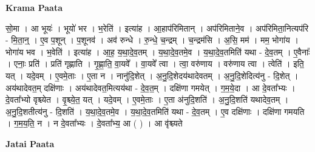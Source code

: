 \documentclass[17pt]{extarticle}
\begin{document}
\textbf{Krama Paata} \newline

सो॒मा । आ भूयः॑ । भूयो॑ भर । भ॒रेति॑ । इत्या॑ह । आ॒हाप॑रिमितान् । अप॑रिमिताने॒व । अप॑रिमिता॒नित्यप॑रि - मि॒ता॒न्॒ । ए॒व प॒शून् । प॒शूनव॑ । अव॑ रुन्धे । रु॒न्धे॒ च॒न्द्रम् । च॒न्द्रम॑सि । अ॒सि॒ मम॑ । मम॒ भोगा॑य । भोगा॑य भव । भ॒वेति॑ । इत्या॑ह । आ॒ह॒ य॒था॒दे॒व॒तम् । य॒था॒दे॒व॒तमे॒व । य॒था॒दे॒व॒तमिति॑ यथा - दे॒व॒तम् । ए॒वैनाः᳚ । एनाः॒ प्रति॑ । प्रति॑ गृह्णाति । गृ॒ह्णा॒ति॒ वा॒यवे᳚ । वा॒यवे᳚ त्वा । त्वा॒ वरु॑णाय । वरु॑णाय त्वा । त्वेति॑ । इति॒ यत् । यदे॒वम् । ए॒वमे॒ताः । ए॒ता न । नानु॑दि॒शेत् । अ॒नु॒दि॒शेदय॑थादेवतम् । अ॒नु॒दि॒शेदित्य॑नु - दि॒शेत् । अय॑थादेवत॒म् दक्षि॑णाः । अय॑थादेवत॒मित्यय॑था - दे॒व॒त॒म् । दक्षि॑णा गमयेत् । ग॒म॒ये॒दा । आ दे॒वता᳚भ्यः । दे॒वता᳚भ्यो वृश्च्येत । वृ॒श्च्ये॒त॒ यत् । यदे॒वम् । ए॒वमे॒ताः । ए॒ता अ॑नुदि॒शति॑ । अ॒नु॒दि॒शति॑ यथादेव॒तम् । अ॒नु॒दि॒शतीत्य॑नु - दि॒शति॑ । य॒था॒दे॒व॒तमे॒व । य॒था॒दे॒व॒तमिति॑ यथा - दे॒व॒तम् । ए॒व दक्षि॑णाः । दक्षि॑णा गमयति । ग॒म॒य॒ति॒ न । न दे॒वता᳚भ्यः । दे॒वता᳚भ्य॒ आ ( ) । आ वृ॑श्च्यते \newline

\textbf{Jatai Paata} \newline
\end{document}
